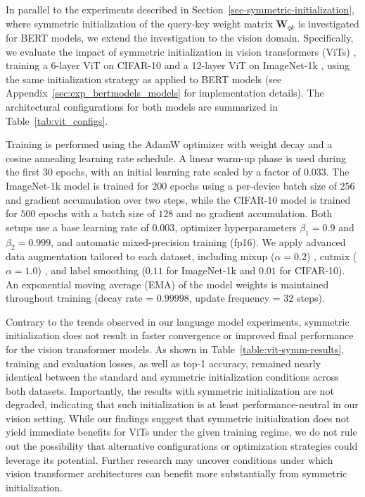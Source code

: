 %

%
In parallel to the experiments described in Section~\ref{sec-symmetric-initialization}, where symmetric initialization of the query-key weight matrix $\bm{W}_{qk}$ is investigated for BERT models, we extend the investigation to the vision domain. Specifically, we evaluate the impact of symmetric initialization in vision transformers (ViTs) \citep{dosovitskiyImageWorth16x162021}, training a 6-layer ViT on CIFAR-10 \citep{krizhevsky2009learning} and a 12-layer ViT on ImageNet-1k \citep{deng_imagenet_2009}, using the same initialization strategy as applied to BERT models (see Appendix~\ref{sec:exp_bertmodels_models} for implementation details). The architectural configurations for both models are summarized in Table~\ref{tab:vit_configs}.

Training is performed using the AdamW optimizer \citep{Loshchilov_Hutter_2019} with weight decay and a cosine annealing learning rate schedule. A linear warm-up phase is used during the first $30$ epochs, with an initial learning rate scaled by a factor of $0.033$. The ImageNet-1k model is trained for $200$ epochs using a per-device batch size of $256$ and gradient accumulation over two steps, while the CIFAR-10 model is trained for $500$ epochs with a batch size of $128$ and no gradient accumulation. Both setups use a base learning rate of $0.003$, optimizer hyperparameters $\beta_1 = 0.9$ and $\beta_2 = 0.999$, and automatic mixed-precision training (fp16). We apply advanced data augmentation tailored to each dataset, including mixup ($\alpha = 0.2$) \citep{zhang2018mixup}, cutmix ($\alpha = 1.0$) \citep{Yun_cutmix_2019}, and label smoothing ($0.11$ for ImageNet-1k and $0.01$ for CIFAR-10). An exponential moving average (EMA) of the model weights \citep{Tarvainen_mean_2017} is maintained throughout training (decay rate = $0.99998$, update frequency = $32$ steps).
%


Contrary to the trends observed in our language model experiments, symmetric initialization does not result in faster convergence or improved final performance for the vision transformer models. As shown in Table~\ref{table:vit-symm-results}, training and evaluation losses, as well as top-1 accuracy, remained nearly identical between the standard and symmetric initialization conditions across both datasets.
Importantly, the results with symmetric initialization are not degraded, indicating that such initialization is at least performance-neutral in our vision setting. While our findings suggest that symmetric initialization does not yield immediate benefits for ViTs under the given training regime, we do not rule out the possibility that alternative configurations or optimization strategies could leverage its potential. Further research may uncover conditions under which vision transformer architectures can benefit more substantially from symmetric initialization.